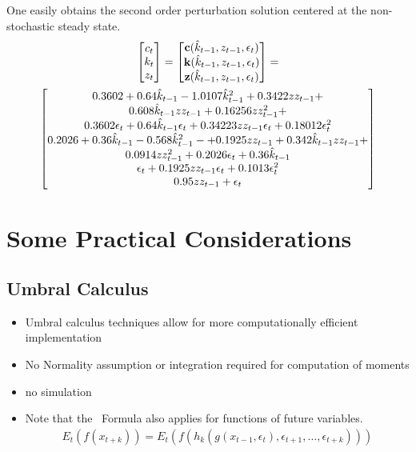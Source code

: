 \documentclass[12pt]{article}
\begin{document}
One  easily obtains the second order 
perturbation solution centered at the non-stochastic steady
state.%
\begin{gather*}
  \begin{bmatrix}
    c_t\\k_t\\z_t
  \end{bmatrix}=
\begin{bmatrix}
{\bf c}(\hat{k}_{t-1},z_{t-1},\epsilon_{t})\\ 
{\bf k}(\hat{k}_{t-1},z_{t-1},\epsilon_{t})\\
{\bf z}(\hat{k}_{t-1},z_{t-1},\epsilon_{t})  
\end{bmatrix}= 
\\
\begin{bmatrix}
 0.3602 + 0.64\hat{k}_{t-1} - 
  1.0107\hat{k}_{t-1}^2 +  0.3422zz_{t-1} + \\0.608\hat{k}_{t-1}zz_{t-1} + 
  0.16256zz_{t-1}^2 + \\0.3602\epsilon_{t} + 
  0.64\hat{k}_{t-1}\epsilon_{t} + 0.34223zz_{t-1}\epsilon_{t} + 
  0.18012\epsilon_{t}^2 \\
0.2026 + 
  0.36\hat{k}_{t-1} - 0.568\hat{k}_{t-1}^2 - 
   + 0.1925zz_{t-1} + 
  0.342\hat{k}_{t-1}zz_{t-1} +\\ 0.0914zz_{t-1}^2 + 
  0.2026\epsilon_{t} + 0.36\hat{k}_{t-1}\\
   \epsilon_{t} + 0.1925zz_{t-1}\epsilon_{t} + 
  0.1013\epsilon_{t}^2\\
  0.95zz_{t-1} + \epsilon_{t}
\end{bmatrix}
\end{gather*}


\section{Some Practical Considerations}

\subsection{Umbral Calculus}

\begin{itemize}
\item Umbral calculus techniques allow for more computationally efficient 
implementation\cite{nardo11}
\item No Normality assumption or integration required for computation of moments
\item no simulation
\item Note that the \faa\ Formula also applies for functions of future variables.
\begin{gather*}
  E_t(f(x_{t+k}))= E_t( f(h_k(g(x_{t-1},\epsilon_t),\epsilon_{t+1},\ldots,\epsilon_{t+k})))
\end{gather*}
\end{itemize}
\end{document}
